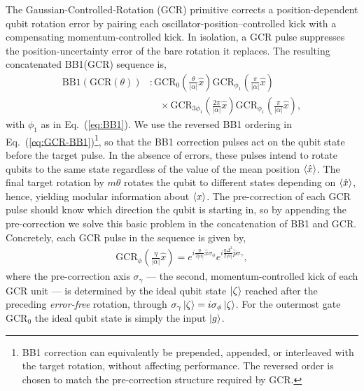 \documentclass[aps,prx,showpacs,notitlepage,twocolumn,superscriptaddress,nofootinbib,preprintnumbers,floatfix,10pt, longbibliography]{revtex4-2}
\begin{document}
{The Gaussian-Controlled-Rotation (GCR) primitive corrects a
position-dependent qubit rotation error by pairing each
oscillator-position--controlled kick with a compensating
momentum-controlled kick. In isolation, a GCR pulse suppresses the
position-uncertainty error of the bare rotation it replaces.
The resulting concatenated BB1(GCR) sequence is,
\begin{align}
  \mathrm{BB1}(\mathrm{GCR}(\theta))&:
  \mathrm{GCR}_0\!\left(\frac{\theta}{|\alpha|}\hat{x}\right)
  \mathrm{GCR}_{\phi_1}\!\left(\frac{\pi}{|\alpha|}\hat{x}\right)\nonumber\\
  &\quad\times\mathrm{GCR}_{3\phi_1}\!\left(\frac{2\pi}{|\alpha|}\hat{x}\right)
  \mathrm{GCR}_{\phi_1}\!\left(\frac{\pi}{|\alpha|}\hat{x}\right),
  \label{eq:GCR-BB1}
\end{align}
with $\phi_1$ as in Eq.~(\ref{eq:BB1}). We use the reversed BB1
ordering in Eq.~(\ref{eq:GCR-BB1})\footnote{BB1 correction can equivalently be prepended,
appended, or interleaved with the target rotation, without affecting
performance.  The reversed order is chosen to match the pre-correction
structure required by GCR.}, so that the BB1 correction pulses act on the qubit state before the target pulse. In the absence of errors, these pulses intend to rotate qubits to the same state regardless of the value of the mean position $\braket{\hat x}$. The final target rotation by $m\theta$ rotates the qubit to different states depending on $\braket{\hat x}$, hence, yielding modular information about $\braket{x}$. The pre-correction of each GCR pulse should know which direction the qubit is starting in, so by appending the pre-correction we solve this basic problem in the concatenation of BB1 and GCR. Concretely, each GCR pulse in the sequence is given by,
\begin{align}
   \mathrm{GCR}_{\phi}\!\left(\frac{\eta}{|\alpha|}\hat{x}\right)
   = e^{i\frac{\eta}{2|\alpha|}\hat{x}\sigma_{\phi}}
     e^{i\frac{\eta\Delta^2}{2|\alpha|}\hat{p}\sigma_\gamma},
\end{align}
where the pre-correction axis $\sigma_\gamma$ --- the second, momentum-controlled
kick of each GCR unit --- is determined by the ideal qubit state $\ket{\zeta}$
reached after the preceding \emph{error-free} rotation, through
$\sigma_\gamma\ket{\zeta}=i\sigma_\phi\ket{\zeta}$.  For the outermost gate
$\mathrm{GCR}_0$ the ideal qubit state is simply the input $\ket{g}$.

}
\end{document}
